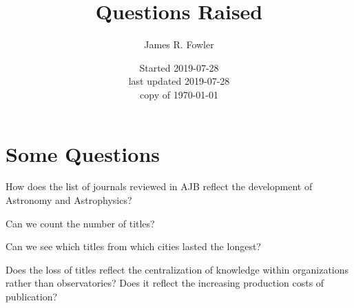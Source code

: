 \documentclass{article}
\begin{document}
\title{Questions Raised}
\author{James R. Fowler}
\date{Started 2019-07-28\\ last updated 2019-07-28\\ copy of \today}
\maketitle

\section{Some Questions}

How does the list of journals reviewed in AJB reflect the
development of  Astronomy and Astrophysics?

Can we count the number of titles?

Can we see which titles from which cities lasted the longest?

Does the loss of titles reflect the centralization of knowledge
within organizations rather than observatories? Does it reflect the
increasing production costs of publication?

\vfil\eject

\printbibliography
\end{document}
